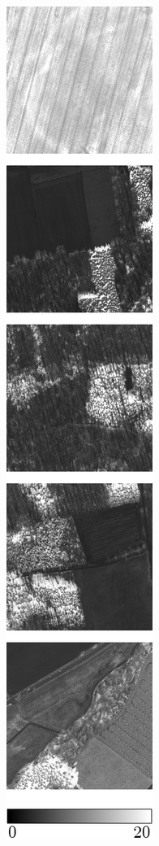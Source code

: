 \begin{figure}[h]
\begin{subfigure}{\VegetationImageWidth}
        \caption{}
        \label{fig:svi_original}
    \end{subfigure} \hspace{2mm}
    \begin{subfigure}{\VegetationImageWidth}
        \includegraphics[width=\textwidth]{images/vegetation/rvi}

\end{subfigure}
\end{figure}
